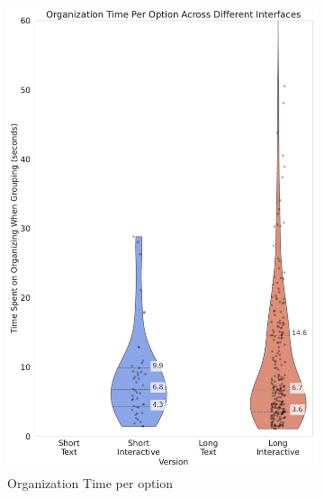 \begin{figure}[htbp]
{\begin{minipage}{0.78\pdfpageheight}
\begin{subfigure}[b]{0.26\pdfpageheight}
                \includegraphics[width=\textwidth]{content/image/results/org_time_per_option.pdf}
                \caption{Organization Time per option}
                \label{fig:org_time}
            \end{subfigure}
            \begin{subfigure}[b]{0.26\pdfpageheight}
                \centering

\end{subfigure}
\end{minipage}}
\end{figure}
